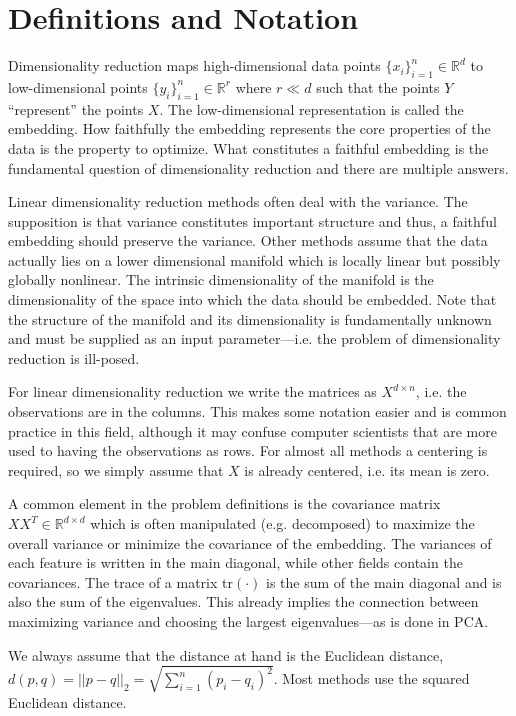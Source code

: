 \section{Definitions and Notation}

Dimensionality reduction maps high-dimensional data points $\{ x_i \}_{i=1}^{n}
\in \mathbb{R}^d$ to low-dimensional points $\{ y_i \}_{i=1}^{n} \in
\mathbb{R}^r$ where $r \ll d$ such that the points $Y$ ``represent'' the points
$X$. The low-dimensional representation is called the embedding. How faithfully
the embedding represents the core properties of the data is the property to
optimize.  What constitutes a faithful embedding is the fundamental question of
dimensionality reduction and there are multiple answers.

Linear dimensionality reduction methods often deal with the variance. The supposition is
that variance constitutes important structure and thus, a faithful embedding should preserve the
variance. Other methods assume that the data actually lies on a lower dimensional manifold which
is locally linear but possibly globally nonlinear. The intrinsic dimensionality of the manifold
is the dimensionality of the space into which the data should be embedded. Note that the structure
of the manifold and its dimensionality is fundamentally unknown and must be supplied as an
input parameter---i.e. the problem of dimensionality reduction is ill-posed.

For linear dimensionality reduction we write the matrices as $X^{d \times n}$, i.e. the
observations are in the columns. This makes some notation easier and is common practice
in this field, although it may confuse computer scientists that are more used to having
the observations as rows. For almost all methods a centering is required, so we simply
assume that $X$ is already centered, i.e. its mean is zero.

A common element in the problem definitions is the covariance matrix $XX^T \in \mathbb{R}^{d \times d}$ which is
often manipulated (e.g. decomposed) to maximize the overall variance or minimize
the covariance of the embedding. The variances of each feature is written in the main diagonal,
while other fields contain the covariances. The trace of a matrix $\text{tr}(\cdot)$
is the sum of the main diagonal and is also the sum of the eigenvalues. This already
implies the connection between maximizing variance and choosing the largest
eigenvalues---as is done in PCA.

We always assume that the distance at hand is the Euclidean distance, $d(p,q) =
|| p - q ||_2 = \sqrt{\sum_{i=1}^n (p_i - q_i)^2}$.  Most methods use the
squared Euclidean distance.

